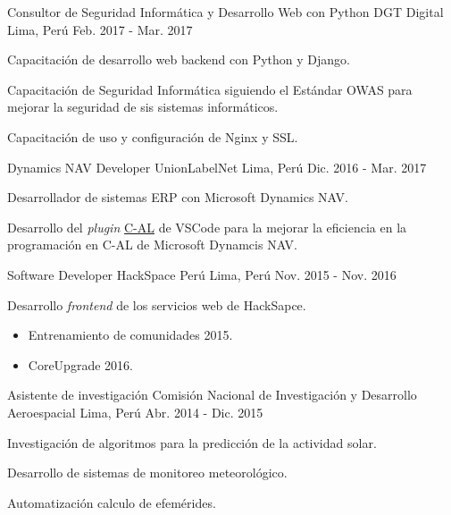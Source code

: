 \begin{cventries}
  \cventry
    {Consultor de Seguridad Informática y Desarrollo Web con Python} %
    {DGT Digital} %
    {Lima, Perú} %
    {Feb. 2017 - Mar. 2017} %
    {
      \begin{cvitems} %
        \item {Capacitación de desarrollo web backend con Python y Django.}
        \item {Capacitación de Seguridad Informática siguiendo el Estándar OWAS
        para mejorar la seguridad de sis sistemas informáticos.}
        \item {Capacitación de uso y configuración de Nginx y SSL.}
      \end{cvitems}
    }

  \cventry
    {Dynamics NAV Developer} %
    {UnionLabelNet} %
    {Lima, Perú} %
    {Dic. 2016 - Mar. 2017} %
    {
      \begin{cvitems} %
        \item {Desarrollador de sistemas ERP con Microsoft Dynamics NAV.}
        \item {Desarrollo del \textit{plugin} \href{https://goo.gl/4iA8ma}{C-AL} de VSCode para la mejorar la
        eficiencia en la programación en C-AL de Microsoft Dynamcis NAV.}
      \end{cvitems}
    }

  \cventry
    {Software Developer} %
    {HackSpace Perú} %
    {Lima, Perú} %
    {Nov. 2015 - Nov. 2016} %
    {
      \begin{cvitems} %
        \item {Desarrollo \textit{frontend} de los servicios web de HackSapce.}
        \begin{itemize}
          \item {Entrenamiento de comunidades 2015.}
          \item {CoreUpgrade 2016.}
        \end{itemize}
      \end{cvitems}
    }

  \cventry
    {Asistente de investigación} %
    {Comisión Nacional de Investigación y Desarrollo Aeroespacial} %
    {Lima, Perú} %
    {Abr. 2014 - Dic. 2015} %
    {
      \begin{cvitems} %
        \item {Investigación de algoritmos para la  predicción de la actividad
        solar.}
        \item {Desarrollo de sistemas de monitoreo meteorológico.}
        \item {Automatización calculo de efemérides.}
      \end{cvitems}
    }


\end{cventries}
